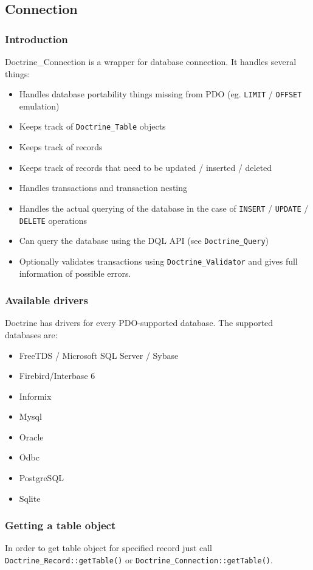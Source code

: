 \documentclass[11pt,a4paper]{report}
\begin{document}
\subsection{Connection}
\subsubsection{Introduction}
Doctrine\_Connection is a wrapper for database connection. It handles several things:

\begin{itemize}
\item{ Handles database portability things missing from PDO (eg. \texttt{LIMIT} / \texttt{OFFSET} emulation)}
\item{ Keeps track of \texttt{Doctrine\_Table} objects}
\item{ Keeps track of records}
\item{ Keeps track of records that need to be updated / inserted / deleted}
\item{ Handles transactions and transaction nesting}
\item{ Handles the actual querying of the database in the case of \texttt{INSERT} / \texttt{UPDATE} / \texttt{DELETE} operations}
\item{ Can query the database using the DQL API (see \texttt{Doctrine\_Query})}
\item{ Optionally validates transactions using \texttt{Doctrine\_Validator} and gives full information of possible errors.}
\end{itemize}
\subsubsection{Available drivers}
Doctrine has drivers for every PDO-supported database. The supported databases are:

\begin{itemize}
\item{FreeTDS / Microsoft SQL Server / Sybase}
\item{Firebird/Interbase 6}
\item{Informix}
\item{Mysql}
\item{Oracle}
\item{Odbc}
\item{PostgreSQL}
\item{Sqlite}
\end{itemize}
\subsubsection{Getting a table object}
In order to get table object for specified record just call \texttt{Doctrine\_Record::getTable()} or \texttt{Doctrine\_Connection::getTable()}.
\end{document}
